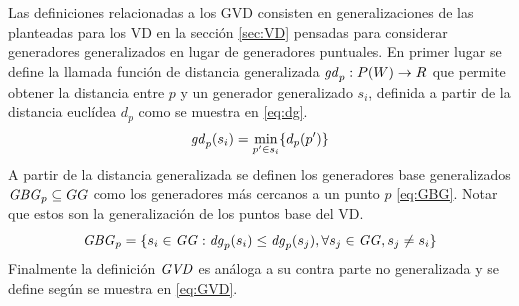 Las definiciones relacionadas a los GVD consisten en generalizaciones de
las planteadas para los VD en la sección \ref{sec:VD} pensadas para considerar
generadores generalizados en lugar de generadores puntuales. 
En primer lugar se define la llamada función de distancia generalizada
$\mathit{gd}_p : P(W) \rightarrow R$ que permite obtener la distancia entre
$p$ y un generador generalizado $s_i$, definida a partir de la distancia
euclídea $d_p$ como se muestra en \eqref{eq:dg}.
\begin{equation}
  \mathit{gd}_p(s_i) = \min_{p'\in s_i}\{d_p(p')\} \label{eq:dg}
\end{equation}
A partir de la distancia generalizada se definen los generadores base
generalizados $\mathit{GBG}_p\subseteq GG$ como los generadores más
cercanos a un punto $p$ \eqref{eq:GBG}. Notar que estos son la
generalización de los puntos base del VD.
\begin{equation}
  \mathit{GBG}_p = \{s_i \in \mathit{GG}: \mathit{dg}_p(s_i) \leq \mathit{dg}_p(s_j), \forall s_j\in \mathit{GG}, s_j \neq s_i\}\label{eq:GBG}
\end{equation}
Finalmente la definición $\mathit{GVD}$ es análoga a su contra parte no
generalizada y se define según se muestra en \eqref{eq:GVD}. 


